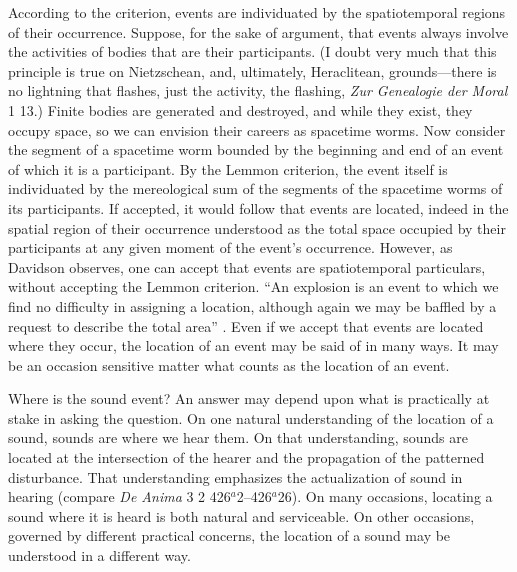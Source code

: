 According to the \citet{Lemmon:1967aa} criterion, events are individuated by the spatiotemporal regions of their occurrence. Suppose, for the sake of argument, that events always involve the activities of bodies that are their participants. (I doubt very much that this principle is true on Nietzschean, and, ultimately, Heraclitean, grounds---there is no lightning that flashes, just the activity, the flashing, \emph{Zur Genealogie der Moral} 1 13.) Finite bodies are generated and destroyed, and while they exist, they occupy space, so we can envision their careers as spacetime worms. Now consider the segment of a spacetime worm bounded by the beginning and end of an event of which it is a participant. By the Lemmon criterion, the event itself is individuated by the mereological sum of the segments of the spacetime worms of its participants. If accepted, it would follow that events are located, indeed in the spatial region of their occurrence understood as the total space occupied by their participants at any given moment of the event's occurrence. However, as Davidson observes, one can accept that events are spatiotemporal particulars, without accepting the Lemmon criterion. ``An explosion is an event to which we find no difficulty in assigning a location, although again we may be baffled by a request to describe the total area'' \citep[304]{Davidson:1969da}. Even if we accept that events are located where they occur, the location of an event may be said of in many ways. It may be an occasion sensitive matter what counts as the location of an event. 

Where is the sound event? An answer may depend upon what is practically at stake in asking the question. On one natural understanding of the location of a sound, sounds are where we hear them. On that understanding, sounds are located at the intersection of the hearer and the propagation of the patterned disturbance. That understanding emphasizes the actualization of sound in hearing (compare \emph{De Anima} 3 2 426\( ^{a} \)2--426\( ^{a} \)26). On many occasions, locating a sound where it is heard is both natural and serviceable.  On other occasions, governed by different practical concerns, the location of a sound may be understood in a different way. 

